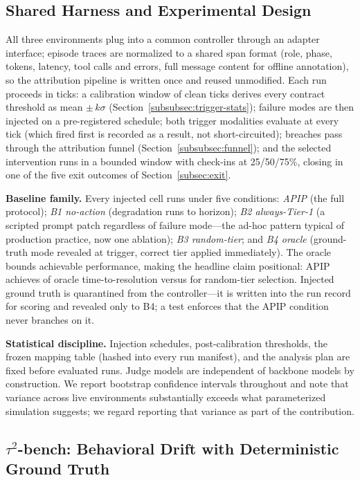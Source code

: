 \subsection{Shared Harness and Experimental Design}
\label{subsec:eval-harness}

All three environments plug into a common controller through an adapter
interface; episode traces are normalized to a shared span format (role, phase,
tokens, latency, tool calls and errors, full message content for offline
annotation), so the attribution pipeline is written once and reused
unmodified. Each run proceeds in ticks: a calibration window of clean ticks
derives every contract threshold as mean $\pm\, k\sigma$
(Section~\ref{subsubsec:trigger-stats}); failure modes are then injected on a
pre-registered schedule; both trigger modalities evaluate at every tick (which
fired first is recorded as a result, not short-circuited); breaches pass
through the attribution funnel (Section~\ref{subsubsec:funnel}); and the
selected intervention runs in a bounded window with check-ins at 25/50/75\%,
closing in one of the five exit outcomes of Section~\ref{subsec:exit}.

\textbf{Baseline family.} Every injected cell runs under five conditions:
\emph{APIP} (the full protocol); \emph{B1 no-action} (degradation runs to
horizon); \emph{B2 always-Tier-1} (a scripted prompt patch regardless of
failure mode---the ad-hoc pattern typical of production practice, now one
ablation); \emph{B3 random-tier}; and \emph{B4 oracle} (ground-truth
mode revealed at trigger, correct tier applied immediately). The oracle bounds
achievable performance, making the headline claim positional: APIP achieves
\ttrOraclePct{} of oracle time-to-resolution versus \ttrRandomPct{} for
random-tier selection. Injected ground truth is quarantined from the
controller---it is written into the run record for scoring and revealed only
to B4; a test enforces that the APIP condition never branches on it.

\textbf{Statistical discipline.} Injection schedules, post-calibration
thresholds, the frozen mapping table (hashed into every run manifest), and the
analysis plan are fixed before evaluated runs. Judge models are independent of
backbone models by construction. We report bootstrap confidence intervals
throughout and note that variance across live environments substantially
exceeds what parameterized simulation suggests; we regard reporting that
variance as part of the contribution.

\subsection{$\tau^2$-bench: Behavioral Drift with Deterministic Ground Truth}
\label{subsec:eval-tau}

